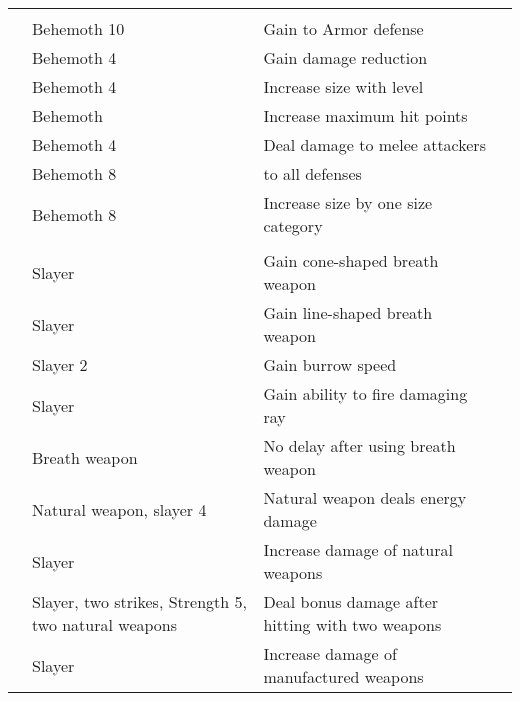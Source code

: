\begin{longtabuwrapper}
\begin{longtabu}{>{\lcol}p{10em} >{\lcol}p{15em} >{\lcol}X >{\lcol}p{3em}}
            \midrule
            \label{Behemoth Traits} &  &  &  \\
             & Behemoth 10 & Gain  to Armor defense &  \\
             & Behemoth 4 & Gain damage reduction &  \\
             & Behemoth 4 & Increase size with level &  \\
             & Behemoth & Increase maximum hit points &  \\
             & Behemoth 4 & Deal damage to melee attackers &  \\
             & Behemoth 8 &  to all defenses &  \\
             & Behemoth 8 & Increase size by one size category &  \\

            \midrule
            \label{Slayer Traits} &  &  &  \\
             & Slayer & Gain cone-shaped breath weapon &  \\
             & Slayer & Gain line-shaped breath weapon &  \\
             & Slayer 2 & Gain burrow speed &  \\
             & Slayer & Gain ability to fire damaging ray &  \\
             & Breath weapon & No delay after using breath weapon &  \\
             & Natural weapon, slayer 4 & Natural weapon deals energy damage &  \\
             & Slayer & Increase damage of natural weapons &  \\
             & Slayer, two strikes, Strength 5, two natural weapons & Deal bonus damage after hitting with two weapons &  \\
             & Slayer & Increase damage of manufactured weapons &  \\
        \end{longtabu}
    \end{longtabuwrapper}

